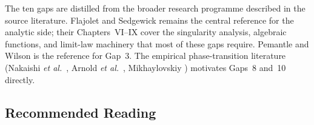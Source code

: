 The ten gaps are distilled from the broader research programme described in the source literature. Flajolet and Sedgewick \cite{FlajoletSedgewick2009} remains the central reference for the analytic side; their Chapters~VI--IX cover the singularity analysis, algebraic functions, and limit-law machinery that most of these gaps require. Pemantle and Wilson \cite{PemantleWilson2013} is the reference for Gap~3. The empirical phase-transition literature (Nakaishi \emph{et al.}\ \cite{NakaishiNishikawaHukushima2024}, Arnold \emph{et al.}\ \cite{ArnoldEtAl2024}, Mikhaylovskiy \cite{Mikhaylovskiy2025}) motivates Gaps~8 and~10 directly.

\subsection*{Recommended Reading}

